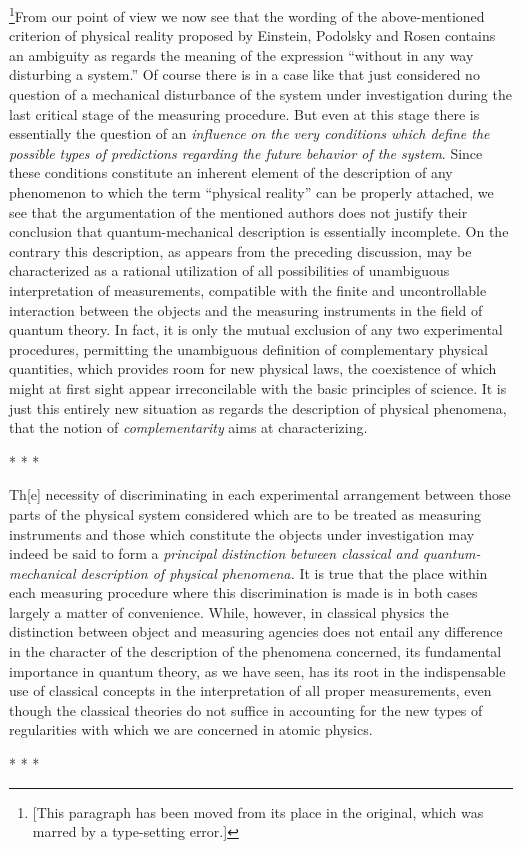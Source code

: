 \documentclass[11pt]{memoir}
\begin{document}
\footnote{{[}This paragraph has been moved from its place in the
  original, which was marred by a type-setting error.{]}}From our point
of view we now see that the wording of the above-mentioned criterion of
physical reality proposed by Einstein, Podolsky and Rosen contains an
ambiguity as regards the meaning of the expression ``without in any way
disturbing a system.'' Of course there is in a case like that just
considered no question of a mechanical disturbance of the system under
investigation during the last critical stage of the measuring procedure.
But even at this stage there is essentially the question of an
\emph{influence} \emph{on the very conditions which define the possible}
\emph{types of predictions regarding the future behavior of the system}.
Since these conditions constitute an inherent element of the description
of any phenomenon to which the term ``physical reality'' can be properly
attached, we see that the argumentation of the mentioned authors does
not justify their conclusion that quantum-mechanical description is
essentially incomplete. On the contrary this description, as appears
from the preceding discussion, may be characterized as a rational
utilization of all possibilities of unambiguous interpretation of
measurements, compatible with the finite and uncontrollable interaction
between the objects and the measuring instruments in the field of
quantum theory. In fact, it is only the mutual exclusion of any two
experimental procedures, permitting the unambiguous definition of
complementary physical quantities, which provides room for new physical
laws, the coexistence of which might at first sight appear
irreconcilable with the basic principles of science. It is just this
entirely new situation as regards the description of physical phenomena,
that the notion of \emph{complementarity} aims at characterizing.\\
%
\centerline{* * *}
%
Th{[}e{]} necessity of discriminating in each experimental arrangement
between those parts of the physical system considered which are to be
treated as measuring instruments and those which constitute the objects
under investigation may indeed be said to form a \emph{principal}
\emph{distinction} \emph{between classical and quantum-mechanical
description of physical phenomena.} It is true that the place within
each measuring procedure where this discrimination is made is in both
cases largely a matter of convenience. While, however, in classical
physics the distinction between object and measuring agencies does not
entail any difference in the character of the description of the
phenomena concerned, its fundamental importance in quantum theory, as we
have seen, has its root in the indispensable use of classical concepts
in the interpretation of all proper measurements, even though the
classical theories do not suffice in accounting for the new types of
regularities with which we are concerned in atomic physics.\\
\centerline{* * *}
%
\end{document}
